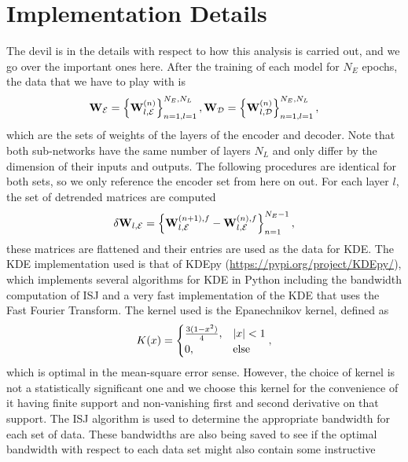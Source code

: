 \section{Implementation Details}
The devil is in the details with respect to how this analysis is carried out, and we
go over the important ones here. After the training of each model for $N_E$ epochs, the 
data that we have to play with is 
\begin{equation}
    {\bf W}_\mathcal{E} = \left\{{\bf W}_{l,\mathcal{E}}^{(n)}\right\}_{n=1, l=1}^{N_E, N_L}, 
    {\bf W}_\mathcal{D} = \left\{{\bf W}_{l,\mathcal{D}}^{(n)}\right\}_{n=1, l=1}^{N_E, N_L}, 
\end{equation}
which are the sets of weights of the layers of the encoder and decoder. Note that both sub-networks 
have the same number of layers $N_L$ and only differ by the dimension of their inputs and outputs.
The following procedures are identical for both sets, so we only reference the encoder set
from here on out. For each layer $l$, the set of detrended matrices are computed
\begin{equation}
    \delta{\bf W}_{l, \mathcal{E}} = \left\{{\bf W}_{l,\mathcal{E}}^{(n+1),f} - {\bf W}_{l,\mathcal{E}}^{(n),f}\right\}_{n=1}^{N_E-1},
\end{equation}
these matrices are flattened and their entries are used as the data for KDE. The KDE implementation
used is that of KDEpy (\href{https://pypi.org/project/KDEpy/}{https://pypi.org/project/KDEpy/}), which implements several 
algorithms for KDE in Python including the bandwidth computation of ISJ and a very fast implementation
of the KDE that uses the Fast Fourier Transform. The kernel used is the Epanechnikov kernel, defined as 
\begin{equation}
    K(x) = 
    \begin{cases}
        \frac{3(1-x^2)}{4}, & \left|x\right| < 1 \\
        0, & \text{else}
    \end{cases},\label{eqn:epanechnikov}
\end{equation}
which is optimal in the mean-square error sense. However, the choice of kernel is not a statistically 
significant one \cite{epanechnikov} and we choose this kernel for the convenience of it having finite 
support and non-vanishing first and second derivative on that support. The ISJ algorithm is used to 
determine the appropriate bandwidth for each set of data. These bandwidths are also being saved to 
see if the optimal bandwidth with respect to each data set might also contain some instructive 
